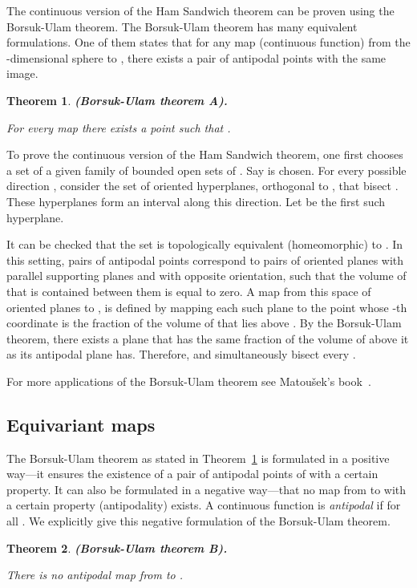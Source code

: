 \documentclass{article}
\newtheorem{theorem}{Theorem}
\begin{document}
The continuous version of the Ham Sandwich theorem can be
proven using the Borsuk-Ulam theorem. The Borsuk-Ulam theorem has
many equivalent formulations. One of them 
states that for any map (continuous function) from the  -dimensional sphere 
to , there exists a pair of antipodal points
with the same image. 

\begin{theorem} \textbf{(Borsuk-Ulam theorem A).} \label{thm:borsuk_p}

For every map  there
exists a point  such that .
\end{theorem}

To prove the continuous version of the Ham Sandwich theorem, one first chooses a set
of a given family of bounded open sets  of .
Say  is chosen. For every possible direction , consider the set of oriented
hyperplanes, orthogonal to , that bisect . These hyperplanes form an interval
along this direction. Let  be the first such hyperplane. 

It can be checked that the set 
is topologically equivalent (homeomorphic) to . In this setting, 
pairs of antipodal points
correspond to pairs of oriented planes with parallel supporting planes and 
with opposite orientation, such that the volume of  that
is contained between them is equal to zero. A map  from this space 
of oriented planes to , is defined by 
mapping each such plane  to the point  whose
-th coordinate is the fraction of the volume of  that lies above .
By the Borsuk-Ulam theorem, there exists a plane  that has
the same fraction of the volume of  above it as its antipodal plane  has. 
Therefore,  and  simultaneously
bisect every .

For more applications of the Borsuk-Ulam theorem see Matou{\v{s}}ek's book~\cite{borsuk}.

\subsection{Equivariant maps}\label{sec:eq_map}

The Borsuk-Ulam theorem as stated in Theorem~\ref{thm:borsuk_p} is
formulated in a positive way---it ensures the existence of a pair
of antipodal points of  with a certain property.
It can also be formulated in a negative way---that no map 
from  to  with a certain property (antipodality) exists. A continuous function 
 is \emph{antipodal} if  for all
. We explicitly give this negative formulation of the Borsuk-Ulam theorem.

\begin{theorem}  \textbf{(Borsuk-Ulam theorem B).} \label{thm:borsuk_n}

There is no antipodal map from  to .
\end{theorem}
\end{document}
